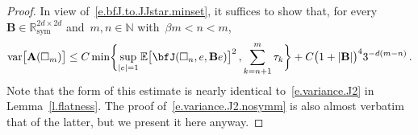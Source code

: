 \documentclass[11pt,twoside]{article} %
\let\oldsquare\square %
\renewcommand{\square}{\oldsquare}
\numberwithin{equation}{section}
\theoremstyle{definition}
\newcommand*{\N}{\ensuremath{\mathbb{N}}}
\newcommand*{\R}{\ensuremath{\mathbb{R}}}
\newcommand{\sym}{\mathrm{sym}}
\newcommand{\cu}{\square}
\newcommand{\E}{\mathbb{E}}
\DeclareMathOperator{\var}{var}
\newcommand{\bfA}{\mathbf{A}}
\begin{document}
\begin{proof}
In view of~\eqref{e.bfJ.to.JJstar.minset}, it suffices to show that, for every~$\mathbf{B}\in \R^{2d\times 2d}_{\sym}$ and~$m,n\in\N$ with~$\beta m  < n < m$,  
\begin{align}
\label{e.variance.J2.nosymm}
\var \bigl[  \bfA(\cu_m) \bigr] 
\leq
C \min \biggl\{ 
\sup_{|e|=1}
\E \bigl[ \bfJ(\cu_n,e,\mathbf{B} e) \bigr]^2
\,,
\sum_{k=n+1}^m \tau_k
\biggr\}
+
C\bigl(1+|\mathbf{B}|\bigr)^4
3^{-d (m-n)}
\,.
\end{align}
Note that the form of this estimate is nearly identical to~\eqref{e.variance.J2} in Lemma~\ref{l.flatness}. The proof of~\eqref{e.variance.J2.nosymm} is also almost verbatim that of the latter, but we present it here anyway. 

\smallskip


\end{proof}
\end{document}
